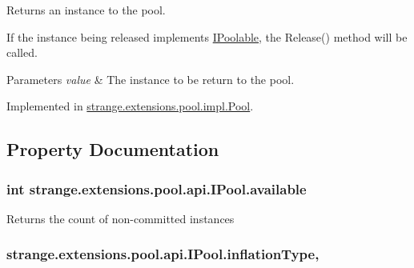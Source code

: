 Returns an instance to the pool. 

If the instance being released implements \hyperlink{interfacestrange_1_1extensions_1_1pool_1_1api_1_1_i_poolable}{I\-Poolable}, the Release() method will be called. 
\begin{DoxyParams}{Parameters}
{\em value} & The instance to be return to the pool.\\
\hline
\end{DoxyParams}


Implemented in \hyperlink{classstrange_1_1extensions_1_1pool_1_1impl_1_1_pool_a0b9746cdab600d749994dfa3de604fc2}{strange.\-extensions.\-pool.\-impl.\-Pool}.



\subsection{Property Documentation}
\hypertarget{interfacestrange_1_1extensions_1_1pool_1_1api_1_1_i_pool_a0ad2b0ade39b7af713a0dfc3ddaec7bf}{
\subsubsection[{available}]{\setlength{\rightskip}{0pt plus 5cm}int strange.\-extensions.\-pool.\-api.\-I\-Pool.\-available\hspace{0.3cm}{\ttfamily [get]}}}\label{interfacestrange_1_1extensions_1_1pool_1_1api_1_1_i_pool_a0ad2b0ade39b7af713a0dfc3ddaec7bf}


Returns the count of non-\/committed instances 

\hypertarget{interfacestrange_1_1extensions_1_1pool_1_1api_1_1_i_pool_aec2e1287c8eb3d188f70e0b121614d26}{
\subsubsection[{inflation\-Type}]{ strange.\-extensions.\-pool.\-api.\-I\-Pool.\-inflation\-Type\hspace{0.3cm}{\ttfamily [get]}, {\ttfamily [set]}}}\label{interfacestrange_1_1extensions_1_1pool_1_1api_1_1_i_pool_aec2e1287c8eb3d188f70e0b121614d26}


